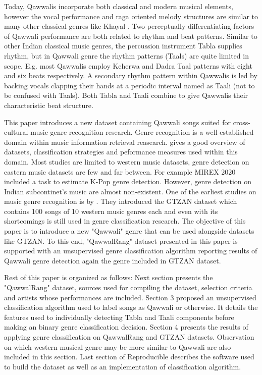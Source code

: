 \documentclass{article}
\begin{document}
Today, Qawwalis incorporate both classical and modern musical elements, however the vocal performance and raga oriented melody structures are similar to many other classical genres like Khayal \citep{qureshi1986sufi}. Two perceptually differentiating factors of Qawwali performance are both related to rhythm and beat patterns. Similar to other Indian classical music genres, the percussion instrument Tabla  supplies rhythm, but in Qawwali genre the rhythm patterns (Taals) are quite limited in scope. E.g. most Qawwalis employ Keherwa  and Dadra Taal patterns with eight and six beats respectively. A secondary rhythm pattern within Qawwalis is led by backing vocals clapping their hands at a periodic interval named as Taali (not to be confused with Taals). Both Tabla and Taali combine to give Qawwalis their characteristic beat structure.

This paper introduces a new dataset containing Qawwali songs suited for cross-cultural music genre recognition research. Genre recognition is a well established domain within music information retrieval reasearch. \cite{music_genre_survey} gives a good overview of datasets, classification strategies and peformance measures used within this domain. Most studies are limited to western music datasets, genre detection on eastern music datasets are few and far between. For example MIREX 2020 \citep{mirex} included a task to estimate K-Pop genre detection. However, genre detection on Indian subcontinet's music are almost non-existent. One of the earliest studies on music genre recognition is by \cite{gtzan}. They introduced the GTZAN dataset which contains 100 songs of 10 western music genres each and even with its shortcomings is still used in genre classification research. The objective of this paper is to introduce a new "Qawwali" genre that can be used alongside datasets like GTZAN. To this end, "QawwalRang" dataset presented in this paper is supported with an unsupervised genre classification algorithm  reporting results of Qawwali genre detection again the genre included in GTZAN dataset.

Rest of this paper is organized as follows: Next section presents the "QawwalRang" dataset, sources used for compiling the dataset, selection criteria and artists whose performances are included. Section 3 proposed an unsupervised classification algorithm used to label songs as Qawwali or otherwise. It details the features used to individually detecting Tabla and Taali components before making an binary genre classification decision. Section 4 presents the results of applying genre classification on QawwalRang and GTZAN datasets. Observation on which western musical genre may be more similar to Qawwali are also included in this section. Last section of Reproducible describes the software used to build the dataset as well as an implementation of classification algorithm.
\end{document}
